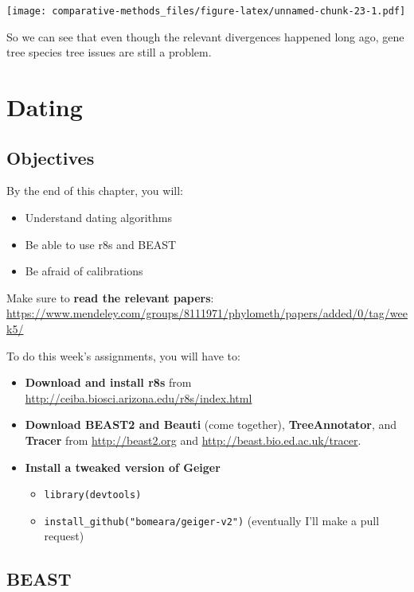 \documentclass[]{article}
\providecommand{\tightlist}{%
  \setlength{\itemsep}{0pt}\setlength{\parskip}{0pt}}
\theoremstyle{definition}
\theoremstyle{definition}
\theoremstyle{definition}
\theoremstyle{remark}
\begin{document}
\texttt{[image: comparative-methods\_files/figure-latex/unnamed-chunk-23-1.pdf]}

So we can see that even though the relevant divergences happened long
ago, gene tree species tree issues are still a problem.

\hypertarget{dating}{%
\section{Dating}\label{dating}}

\hypertarget{objectives-8}{%
\subsection{Objectives}\label{objectives-8}}

By the end of this chapter, you will:

\begin{itemize}
\tightlist
\item
  Understand dating algorithms
\item
  Be able to use r8s and BEAST
\item
  Be afraid of calibrations
\end{itemize}

Make sure to \textbf{read the relevant papers}:
\url{https://www.mendeley.com/groups/8111971/phylometh/papers/added/0/tag/week5/}

To do this week's assignments, you will have to:

\begin{itemize}
\tightlist
\item
  \textbf{Download and install r8s} from
  \url{http://ceiba.biosci.arizona.edu/r8s/index.html}
\item
  \textbf{Download BEAST2 and Beauti} (come together),
  \textbf{TreeAnnotator}, and \textbf{Tracer} from
  \url{http://beast2.org} and \url{http://beast.bio.ed.ac.uk/tracer}.
\item
  \textbf{Install a tweaked version of Geiger}

  \begin{itemize}
  \tightlist
  \item
    \texttt{library(devtools)}
  \item
    \texttt{install\_github("bomeara/geiger-v2")} (eventually I'll make
    a pull request)
  \end{itemize}
\end{itemize}

\hypertarget{beast}{%
\subsection{BEAST}\label{beast}}
\end{document}
